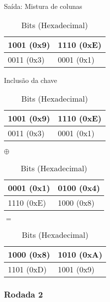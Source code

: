 \documentclass[
    article,            %
    11pt,               %
    oneside,            %
    a4paper,            %
    english,            %
    brazil,             %
    sumario=tradicional,
    ]{abntex2}
\begin{document}
\begin{table}[H]
\centering
\caption{Saída: Mistura de colunas}
\label{tabela-mistura-coluna}
\begin{tabular}{|l|l|}
\hline
1001 (0x9) & 1110 (0xE) \\ \hline
0011 (0x3) & 0001 (0x1) \\ \hline
\end{tabular}
\caption*{Bits (Hexadecimal)}
\end{table}

\label{subsubsub:include-key-round1}

\begin{table}[H]
\centering
\caption{Inclusão da chave}
\label{table-key_include-round1}
\begin{tabular}{|l|l|}
\hline
1001 (0x9) & 1110 (0xE) \\ \hline
0011 (0x3) & 0001 (0x1) \\ \hline
\end{tabular}
$\oplus$
\begin{tabular}{|l|l|}
\hline
0001 (0x1) & 0100 (0x4) \\ \hline
1110 (0xE) & 1000 (0x8) \\ \hline
\end{tabular}
$=$
\begin{tabular}{|l|l|}
\hline
1000 (0x8) & 1010 (0xA)\\ \hline
1101 (0xD) & 1001 (0x9)\\ \hline
\end{tabular}
\caption*{Bits (Hexadecimal)}
\end{table}

\subsubsection{\textbf{Rodada 2}}
\label{subsub:rodada2}

\label{subsubsub:substituicao-nibble-round2}
\end{document}

